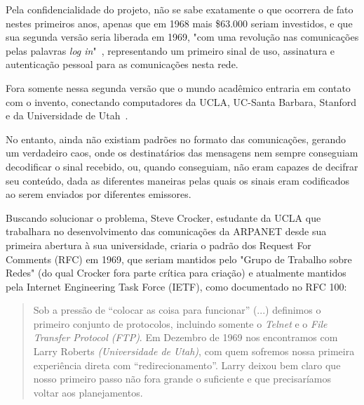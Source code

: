 \documentclass[conference]{IEEEtran}
\begin{document}
  Pela confidencialidade do projeto, não se sabe exatamente o que ocorrera de
  fato nestes primeiros anos, apenas que em 1968 mais \$63.000 seriam investidos, e que sua segunda versão seria liberada em 1969,
   "com uma revolução nas comunicações pelas palavras
    \emph{log in}"~\cite{fromarpanet}, representando um primeiro sinal de uso, assinatura e autenticação pessoal para as comunicações nesta rede.
	
	

  Fora somente nessa segunda versão que o mundo acadêmico entraria em contato
  com o invento, conectando computadores da UCLA, UC-Santa Barbara, Stanford e
  da Universidade de Utah~\cite{fromarpanet}.

  No entanto, ainda não existiam padrões no formato das
  comunicações, gerando um verdadeiro caos, onde os destinatários das mensagens nem sempre conseguiam decodificar o sinal recebido, ou, quando conseguiam, não eram capazes de decifrar seu conteúdo, dada as diferentes maneiras pelas quais os sinais eram codificados ao serem enviados por diferentes emissores.%

  Buscando solucionar o problema, Steve Crocker, estudante da UCLA que trabalhara no desenvolvimento das comunicações da ARPANET desde sua primeira abertura à sua universidade, criaria o padrão dos Request For Comments
  (RFC) em 1969, que seriam mantidos pelo "Grupo de Trabalho sobre Redes" (do qual Crocker fora parte crítica para criação) e atualmente mantidos pela Internet Engineering Task Force (IETF), como documentado no RFC 100:

  \begin{quote}

    Sob a pressão de ``colocar as coisa para funcionar'' (...) definimos o
    primeiro conjunto de protocolos, incluindo somente o \emph{Telnet} e o
    \emph{File Transfer Protocol (FTP)}. Em Dezembro de 1969 nos encontramos com
    Larry Roberts \emph{(Universidade de Utah)}, com quem sofremos nossa
    primeira experiência direta com ``redirecionamento''.
    Larry deixou bem claro que nosso primeiro passo não fora grande o
    suficiente e que precisaríamos voltar aos planejamentos.~\cite{rfc100}
    
  \end{quote}
  
\end{document}
